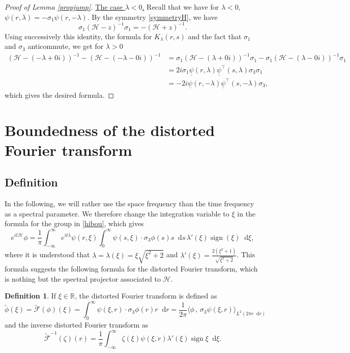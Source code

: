 \documentclass[11 pt]{amsart}
\theoremstyle{definition}
\newtheorem{df}[thm]{Definition}
\theoremstyle{remark}
\numberwithin{equation}{section}
\newcommand{\dd}{\mathop{}\!\mathrm{d}}
\begin{document}
\begin{proof}[Proof of Lemma \ref{propjump}]
\bigskip

\noindent \underline{The case $\lambda<0$.} 
Recall that we have for $\lambda<0$, $\psi(r,\lambda) = - \sigma_1 \psi(r,-\lambda)$.
By the symmetry \eqref{symmetryH}, we have
$$
\sigma_1 (\mathcal{H} - z)^{-1} \sigma_1 = -(\mathcal{H} + z)^{-1}.
$$
Using successively this identity, the formula for $K_\lambda(r,s)$ and the fact that $\sigma_1$ and $\sigma_3$ anticommute, we get for $\lambda>0$
\begin{align*}
\left( \mathcal{H} - (-\lambda + 0i) \right)^{-1} - \left( \mathcal{H} - (-\lambda - 0i) \right)^{-1}
& = \sigma_1 \left( \mathcal{H} - (\lambda + 0i) \right)^{-1} \sigma_1
-  \sigma_1 \left( \mathcal{H} - (\lambda - 0i) \right)^{-1} \sigma_1 \\
& =  2i \sigma_1 \underline{\psi}(r,\lambda) \underline{\psi}^\top (s,\lambda) \sigma_3 \sigma_1 \\
& = - 2i \underline{\psi}(r,-\lambda) \underline{\psi}^\top (s,-\lambda) \sigma_3,
\end{align*}
which gives the desired formula.
\end{proof}

\section{Boundedness of the distorted Fourier transform}

\label{sectiondistorted}

\subsection{Definition}
In the following, we will rather use the space frequency than the time frequency as a spectral parameter. We therefore change the integration variable to $\xi$ in the formula for the group in \eqref{hibou}, which gives
\begin{equation}
\label{formulagroupxi}
e^{it \mathcal{H}} \phi  = \frac{1}{\pi } \int_{-\infty}^\infty e^{it \lambda} \psi(r,\xi) \int_0^\infty \psi(s,\xi) \cdot \sigma_3 \phi(s)s\dd s \, \lambda'(\xi) \operatorname{sign}(\xi) \dd \xi ,
\end{equation}
where it is understood that $\lambda = \lambda(\xi) = \xi \sqrt{ \xi^2 + 2}$ and $\lambda'(\xi) = \frac{2(\xi^2 + 1)}{\sqrt{\xi^2 + 2}}$. This formula suggests the following formula for the distorted Fourier transform, which is nothing but the spectral projector associated to $\mathcal{H}$.

\begin{df}
If $\xi \in \mathbb{R}$, the distorted Fourier transform is defined as
$$
\widetilde{\phi}(\xi) = \widetilde{\mathcal{F}}(\phi)(\xi) = \int_0^\infty \psi(\xi,r) \cdot \sigma_3 \phi(r) r \dd r = \frac{1}{2\pi} \langle \phi \,,\, \sigma_3 \psi(\xi,r) \rangle_{L^2(2\pi r\dd r)}
$$
and the inverse distorted Fourier transform as
$$
\widetilde{\mathcal{F}}^{-1}(\zeta)(r) = \frac 1 \pi \int_{-\infty}^\infty \zeta (\xi) \psi(\xi,r) \lambda'(\xi) \operatorname{sign} \xi \dd\xi.
$$
\end{df}
\end{document}
